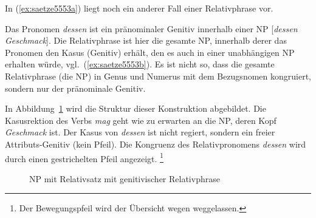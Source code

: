 In (\ref{ex:saetze5553a}) liegt noch ein anderer Fall einer Relativphrase vor.

\begin{exe}
  \ex\label{ex:saetze5553} 
    \begin{xlist}
    \end{xlist}
\end{exe}


Das Pronomen \textit{dessen} ist ein pränominaler Genitiv innerhalb einer NP [\textit{dessen Geschmack}].
Die Relativphrase ist hier die gesamte NP, innerhalb derer das Pronomen den Kasus (Genitiv) erhält, den es auch in einer unabhängigen NP erhalten würde, vgl.\ (\ref{ex:saetze5553b}).
Es ist nicht so, dass die gesamte Relativphrase (die NP) in Genus und Numerus mit dem Bezugsnomen kongruiert, sondern nur der pränominale Genitiv.

In Abbildung~\ref{fig:saetze5553} wird die Struktur dieser Konstruktion abgebildet.
Die Kasusrektion des Verbs \textit{mag} geht wie zu erwarten an die NP, deren Kopf \textit{Geschmack} ist.
Der Kasus von \textit{dessen} ist nicht regiert, sondern ein freier Attributs-Genitiv (kein Pfeil).
Die Kongruenz des Relativpronomens \textit{dessen} wird durch einen gestrichelten Pfeil angezeigt.%
\footnote{Der Bewegungspfeil wird der Übersicht wegen weggelassen.}

\begin{figure}
  \centering
  \caption{NP mit Relativsatz mit genitivischer Relativphrase}
  \label{fig:saetze5553}
\end{figure}

